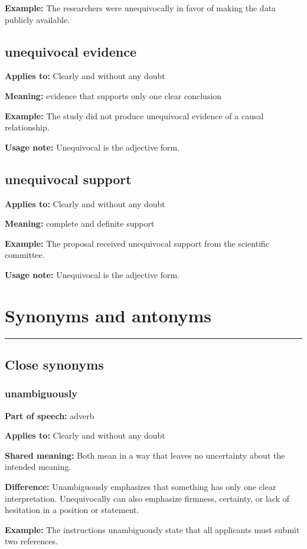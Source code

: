 \documentclass[11pt]{article}
\newcommand{\sectionrule}{\par\vspace{-0.5em}\noindent\textcolor{Accent}{\rule{\linewidth}{0.6pt}}\par}
\begin{document}
\textbf{Example:} The researchers were unequivocally in favor of making the data publicly available.

\subsection{unequivocal evidence}
\textbf{Applies to:} Clearly and without any doubt

\textbf{Meaning:} evidence that supports only one clear conclusion

\textbf{Example:} The study did not produce unequivocal evidence of a causal relationship.

\textbf{Usage note:} Unequivocal is the adjective form.

\subsection{unequivocal support}
\textbf{Applies to:} Clearly and without any doubt

\textbf{Meaning:} complete and definite support

\textbf{Example:} The proposal received unequivocal support from the scientific committee.

\textbf{Usage note:} Unequivocal is the adjective form.

\section{Synonyms and antonyms}
\sectionrule
\subsection{Close synonyms}
\subsubsection{unambiguously}
\textbf{Part of speech:} adverb

\textbf{Applies to:} Clearly and without any doubt

\textbf{Shared meaning:} Both mean in a way that leaves no uncertainty about the intended meaning.

\textbf{Difference:} Unambiguously emphasizes that something has only one clear interpretation. Unequivocally can also emphasize firmness, certainty, or lack of hesitation in a position or statement.

\textbf{Example:} The instructions unambiguously state that all applicants must submit two references.
\end{document}
